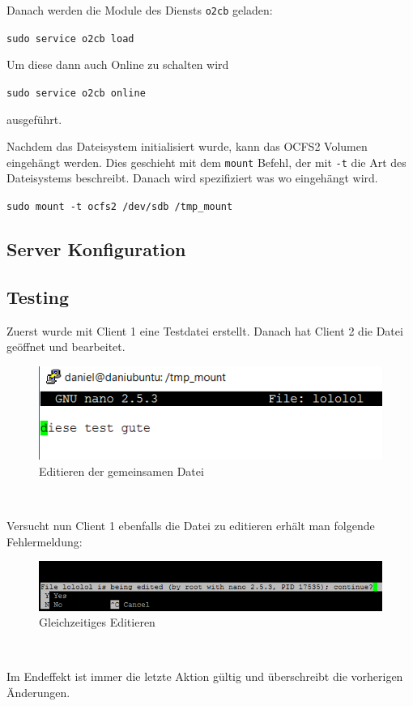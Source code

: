 Danach werden die Module des Diensts \texttt{o2cb} geladen:

\texttt{sudo service o2cb load}

Um diese dann auch Online zu schalten wird

\texttt{sudo service o2cb online}

ausgeführt. \cite{ocfs2faq}

Nachdem das Dateisystem initialisiert wurde, kann das OCFS2 Volumen eingehängt werden. Dies geschieht mit dem \texttt{mount} Befehl, der mit \texttt{-t} die Art des Dateisystems beschreibt. Danach wird spezifiziert was wo eingehängt wird. \cite{ocfs2faq}

\texttt{sudo mount -t ocfs2 /dev/sdb /tmp\_mount}
\subsection{Server Konfiguration}
\subsection{Testing}
Zuerst wurde mit Client 1 eine Testdatei erstellt. Danach hat Client 2 die Datei geöffnet und bearbeitet.
\begin{figure}[!h]
	\begin{center}
		\includegraphics[width=0.5\linewidth]{images/edit.png}
		\caption{Editieren der gemeinsamen Datei}
		\label{edit}
	\end{center}
\end{figure}\

Versucht nun Client 1 ebenfalls die Datei zu editieren erhält man folgende Fehlermeldung:
\begin{figure}[!h]
	\begin{center}
		\includegraphics[width=0.8\linewidth]{images/error.png}
		\caption{Gleichzeitiges Editieren}
		\label{error}
	\end{center}
\end{figure}\

Im Endeffekt ist immer die letzte Aktion gültig und überschreibt die vorherigen Änderungen.